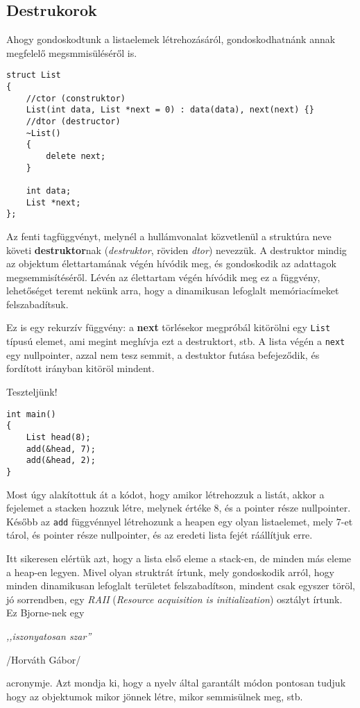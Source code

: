 \documentclass[a4paper,11.5pt]{article}
\begin{document}
	\subsection{Destrukorok}
	Ahogy gondoskodtunk a listaelemek létrehozásáról, gondoskodhatnánk annak megfelelő megsmmisüléséről is.
	\begin{lstlisting}
struct List
{
	//ctor (construktor)
	List(int data, List *next = 0) : data(data), next(next) {}
	//dtor (destructor)
	~List()
	{
		delete next;
	}
	
	int data;
	List *next;
};
	\end{lstlisting}
	Az fenti tagfüggvényt, melynél a hullámvonalat közvetlenül a struktúra neve követi \textbf{destruktor}nak (\textit{destruktor}, röviden \textit{dtor}) nevezzük. A destruktor mindig az objektum élettartamának végén hívódik meg, és gondoskodik az adattagok megsemmisítéséről. Lévén az élettartam végén hívódik meg ez a függvény, lehetőséget teremt nekünk arra, hogy a dinamikusan lefoglalt memóriacímeket felszabadítsuk.
	
	\medskip
	Ez is egy rekurzív függvény: a \textbf{next} törlésekor megpróbál kitörölni egy \texttt{List} típusú elemet, ami megint meghívja ezt a destruktort, stb. A lista végén a \texttt{next} egy nullpointer, azzal nem tesz semmit, a destuktor futása befejeződik, és fordított irányban kitöröl mindent.
	
	\medskip
	Teszteljünk!
	\begin{lstlisting}
int main()
{
	List head(8);
	add(&head, 7);
	add(&head, 2);
}
	\end{lstlisting}
	Most úgy alakítottuk át a kódot, hogy amikor létrehozzuk a listát, akkor a fejelemet a stacken hozzuk létre, melynek értéke 8, és a pointer része nullpointer. Később az \texttt{add} függvénnyel létrehozunk a heapen egy olyan listaelemet, mely 7-et tárol, és pointer része nullpointer, és az eredeti lista fejét ráállítjuk erre.
	\medskip
	
	Itt sikeresen elértük azt, hogy a lista első eleme a stack-en, de minden más eleme a heap-en legyen. Mivel olyan struktrát írtunk, mely gondoskodik arról, hogy minden dinamikusan lefoglalt területet felszabadítson, mindent csak egyszer töröl, jó sorrendben, egy  \textit{RAII} (\textit{Resource acquisition is initialization}) osztályt írtunk. Ez Bjorne-nek egy
	\begin{center}
		\textit{,,iszonyatosan szar''}
		
		/Horváth Gábor/
	\end{center}
	acronymje. Azt mondja ki, hogy a nyelv által garantált módon pontosan tudjuk hogy az objektumok mikor jönnek létre, mikor semmisülnek meg, stb.
	
\end{document}
